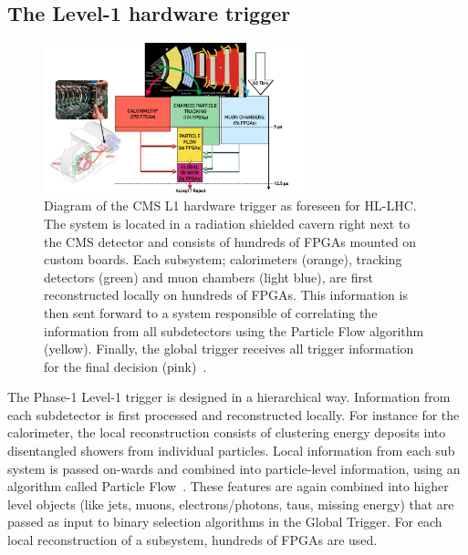 \documentclass[12pt]{iopart}
\begin{document}
\subsection{The Level-1 hardware trigger}
\begin{figure}[ht]
    \centering
    \includegraphics[width=0.69\textwidth]{figures/phase2_l1t.pdf}
    \caption{Diagram of the CMS L1 hardware trigger as foreseen for HL-LHC. The system is located in a radiation shielded cavern right next to the CMS detector and consists of hundreds of FPGAs mounted on custom boards. Each subsystem; calorimeters (orange), tracking detectors (green) and muon chambers (light blue), are first reconstructed locally on  hundreds of FPGAs. This information is then sent forward to a system responsible of correlating the information from all subdetectors using the Particle Flow algorithm (yellow). Finally, the global trigger receives all trigger information for the final decision (pink)~\cite{tdr}.}
    \label{fig:phase2}
\end{figure}
The Phase-1 Level-1 trigger is designed in a hierarchical way. Information from each subdetector is first processed and reconstructed locally. For instance for the calorimeter, the local reconstruction consists of clustering energy deposits into disentangled showers from individual particles. Local information from each sub system is passed on-wards and combined into particle-level information, using an algorithm called Particle Flow~\cite{Sirunyan_2017}. These features are again combined into higher level objects (like jets, muons, electrons/photons, taus, missing energy) that are passed as input to binary selection algorithms in the Global Trigger. For each local reconstruction of a subsystem, hundreds of FPGAs are used.
\end{document}
